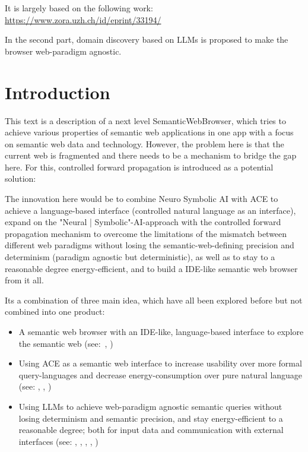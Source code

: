 \documentclass[12pt,a4paper]{article}
\begin{document}
It is largely based on the following work: \url{https://www.zora.uzh.ch/id/eprint/33194/}

In the second part, domain discovery based on LLMs is proposed to make the browser web-paradigm agnostic.

\section{Introduction}

This text is a description of a next level SemanticWebBrowser, which tries to achieve various properties of semantic web applications in one app with a focus on semantic web data and technology. However, the problem here is that the current web is fragmented and there needs to be a mechanism to bridge the gap here. For this, controlled forward propagation is introduced as a potential solution:

The innovation here would be to combine Neuro Symbolic AI with ACE to achieve a language-based interface (controlled natural language as an interface), expand on the "Neural | Symbolic"-AI-approach with the controlled forward propagation mechanism to overcome the limitations of the mismatch between different web paradigms without losing the semantic-web-defining precision and determinism (paradigm agnostic but deterministic), as well as to stay to a reasonable degree energy-efficient, and to build a IDE-like semantic web browser from it all.

Its a combination of three main idea, which have all been explored before but not combined into one product:

\begin{itemize}
    \item A semantic web browser with an IDE-like, language-based interface to explore the semantic web (see:~\cite{semanticWebBrowser}, \cite{headlessBrowsers})
    \item Using ACE as a semantic web interface to increase usability over more formal query-languages and decrease energy-consumption over pure natural language (see: \cite{semanticWebLanguageBased}, \cite{semanticWebControlledEnglish}, \cite{semanticWebAce})
    \item Using LLMs to achieve web-paradigm agnostic semantic queries without losing determinism and semantic precision, and stay energy-efficient to a reasonable degree; both for input data and communication with external interfaces (see: \cite{llmAsDataTranslator}, \cite{llmForIntegratingHeterogenousData}, \cite{neuroSymbolicAi}, \cite{domainDiscoveryTool}, \cite{schemaInference})
\end{itemize}
\end{document}
